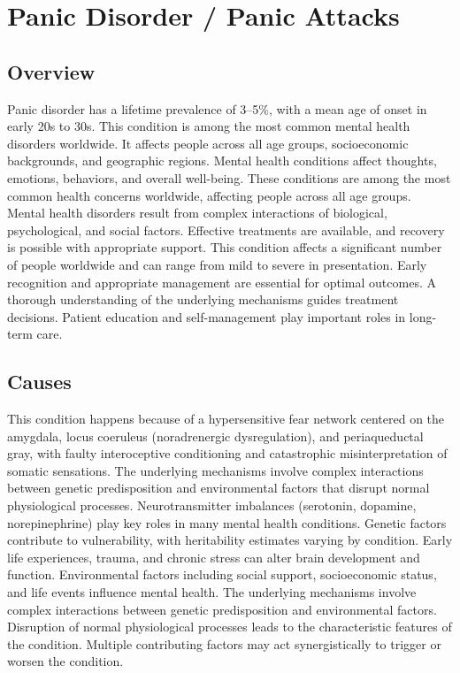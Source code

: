 \chapter{Panic Disorder / Panic Attacks}
\label{sec:Panic Disorder / Panic Attacks}

\section{Overview}
Panic disorder has a lifetime prevalence of 3--5\%, with a mean age of onset in early 20s to 30s. This condition is among the most common mental health disorders worldwide. It affects people across all age groups, socioeconomic backgrounds, and geographic regions. Mental health conditions affect thoughts, emotions, behaviors, and overall well-being. These conditions are among the most common health concerns worldwide, affecting people across all age groups. Mental health disorders result from complex interactions of biological, psychological, and social factors. Effective treatments are available, and recovery is possible with appropriate support. This condition affects a significant number of people worldwide and can range from mild to severe in presentation. Early recognition and appropriate management are essential for optimal outcomes. A thorough understanding of the underlying mechanisms guides treatment decisions. Patient education and self-management play important roles in long-term care.
\section{Causes}
This condition happens because of a hypersensitive fear network centered on the amygdala, locus coeruleus (noradrenergic dysregulation), and periaqueductal gray, with faulty interoceptive conditioning and catastrophic misinterpretation of somatic sensations. The underlying mechanisms involve complex interactions between genetic predisposition and environmental factors that disrupt normal physiological processes. Neurotransmitter imbalances (serotonin, dopamine, norepinephrine) play key roles in many mental health conditions. Genetic factors contribute to vulnerability, with heritability estimates varying by condition. Early life experiences, trauma, and chronic stress can alter brain development and function. Environmental factors including social support, socioeconomic status, and life events influence mental health. The underlying mechanisms involve complex interactions between genetic predisposition and environmental factors. Disruption of normal physiological processes leads to the characteristic features of the condition. Multiple contributing factors may act synergistically to trigger or worsen the condition.
